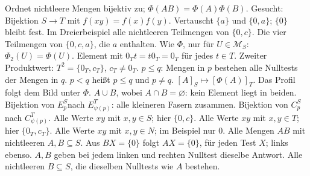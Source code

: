 %
  {Ordnet nichtleere Mengen bijektiv zu; \(\Phi(AB)=\Phi(A)\Phi(B)\).}
%
  {Gesucht: Bijektion \(S\to T\) mit \(f(xy)=f(x)f(y)\).}
%
  {Vertauscht \(\{a\}\) und \(\{0,a\}\); \(\{0\}\) bleibt fest.}
%
  {Im Dreierbeispiel alle nichtleeren Teilmengen von \(\{0,c\}\).}
%
  {Die vier Teilmengen von \(\{0,c,a\}\), die \(a\) enthalten.}
%
  {Wie \(\Phi\), nur für \(U\in\mathcal M_S\): \(\Phi_2(U)=\Phi(U)\).}
%
  {Element mit \(0_Tt=t0_T=0_T\) für jedes \(t\in T\).}
%
  {Zweiter Produktwert: \(T^2=\{0_T,c_T\}\), \(c_T\ne0_T\).}
%
  {\(p\le q\): Mengen in \(p\) bestehen alle Nulltests der Mengen in \(q\).}
%
  {\(p<q\) heißt \(p\le q\) und \(p\ne q\).}
%
  {\([A]_S\!\mapsto\![\Phi(A)]_T\). Das Profil folgt dem Bild unter \(\Phi\).}
%
  {\(A\cup B\), wobei \(A\cap B=\varnothing\): kein Element liegt in beiden.}
%
  {Bijektion von \(E_p^S\)\newline nach \(E_{\psi(p)}^T\): alle kleineren Fasern zusammen.}
%
  {Bijektion von \(C_p^S\)\newline nach \(C_{\psi(p)}^T\).}
%
  {Alle Werte \(xy\) mit \(x,y\in S\); hier \(\{0,c\}\).}
%
  {Alle Werte \(xy\) mit \(x,y\in T\); hier \(\{0_T,c_T\}\).}
%
  {Alle Werte \(xy\) mit \(x,y\in N\); im Beispiel nur \(0\).}
%
  {Alle Mengen \(AB\) mit nichtleeren \(A,B\subseteq S\).}
%
  {Aus \(BX=\{0\}\) folgt \(AX=\{0\}\), für jeden Test \(X\); links ebenso.}
%
  {\(A,B\) geben bei jedem linken und rechten Nulltest dieselbe Antwort.}
%
  {Alle nichtleeren \(B\subseteq S\), die dieselben Nulltests wie \(A\) bestehen.}
